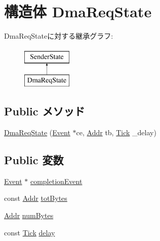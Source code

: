 \hypertarget{structDmaPort_1_1DmaReqState}{
\section{構造体 DmaReqState}
\label{structDmaPort_1_1DmaReqState}
}
DmaReqStateに対する継承グラフ:\begin{figure}[H]
\begin{center}
\leavevmode
\includegraphics[height=2cm]{structDmaPort_1_1DmaReqState}
\end{center}
\end{figure}
\subsection*{Public メソッド}
\begin{DoxyCompactItemize}
\item 
\hyperlink{structDmaPort_1_1DmaReqState_a78244c7f4503a134344a6d078ab5a441}{DmaReqState} (\hyperlink{classEvent}{Event} $\ast$ce, \hyperlink{base_2types_8hh_af1bb03d6a4ee096394a6749f0a169232}{Addr} tb, \hyperlink{base_2types_8hh_a5c8ed81b7d238c9083e1037ba6d61643}{Tick} \_\-delay)
\end{DoxyCompactItemize}
\subsection*{Public 変数}
\begin{DoxyCompactItemize}
\item 
\hyperlink{classEvent}{Event} $\ast$ \hyperlink{structDmaPort_1_1DmaReqState_a196ad739a618f4f20e34e1291bc5852b}{completionEvent}
\item 
const \hyperlink{base_2types_8hh_af1bb03d6a4ee096394a6749f0a169232}{Addr} \hyperlink{structDmaPort_1_1DmaReqState_a578847bbd8b059f5f2d9a51b4fb6ce6a}{totBytes}
\item 
\hyperlink{base_2types_8hh_af1bb03d6a4ee096394a6749f0a169232}{Addr} \hyperlink{structDmaPort_1_1DmaReqState_a959b63fa4a0b167ff8e0709cb82b4556}{numBytes}
\item 
const \hyperlink{base_2types_8hh_a5c8ed81b7d238c9083e1037ba6d61643}{Tick} \hyperlink{structDmaPort_1_1DmaReqState_ad3d3f34195349b5efe722fcacfb348ab}{delay}
\end{DoxyCompactItemize}


